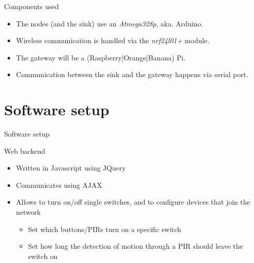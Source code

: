 \documentclass[italian]{beamer}
\begin{document}
\begin{frame}{Components used}
    \begin{itemize}
        \item<1-> The nodes (and the sink) use an \textit{Atmega328p}, aka. Arduino.
        \item<2-> Wireless communication is handled via the \textit{nrf24l01+} module.
        \item<3-> The gateway will be a (Raspberry|Orange|Banana) Pi.
        \item<4-> Communication between the sink and the gateway happens via serial port.
    \end{itemize}
\end{frame}

\section{Software setup}
\begin{frame}{Software setup}
    \centering
\end{frame}

\begin{frame}{Web backend}
    \begin{itemize}
        \item <1-> Written in Javascript using JQuery
        \item <2-> Communicates using AJAX
        \item <3-> Allows to turn on/off single switches, and to configure devices that join the network
            \begin{itemize}
                \item<4-> Set which buttons/PIRs turn on a specific switch
                \item<5-> Set how long the detection of motion through a PIR should leave the switch on
            \end{itemize}
    \end{itemize}
\end{frame}
\end{document}
